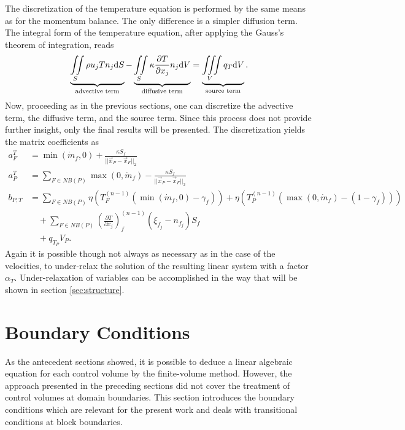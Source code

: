 The discretization of the temperature equation is performed by the same means as for the momentum balance. The only difference is a simpler diffusion term. The integral form of the temperature equation, after applying the Gauss's theorem of integration, reads
\begin{displaymath}
  \underbrace{ \iint\limits_S \rho u_j T n_j \mathrm{d}S }_{\text{advective term}}
  - \underbrace{ \iint\limits_S \kappa \frac{\partial T}{\partial x_j} n_j \mathrm{d}V }_{\text{diffusive term}}
  = \underbrace{\iiint\limits_V \vphantom{\frac{ T}{ x_j} } q_T \mathrm{d}V }_{\text{source term}}.
\end{displaymath}
Now, proceeding as in the previous sections, one can discretize the advective term, the diffusive term, and the source term. Since this process does not provide further insight, only the final results will be presented. The discretization yields the matrix coefficients as
  \begin{align*}
    a_F^{T} &= \min(\dot{m}_f,0) + \frac{\kappa S_f}{||\vec{x}_P - \vec{x}_F||_2} \\[1em]
    a_P^{T} &= \sum_{F \in NB(P)}\max(0,\dot{m}_f) - \frac{\kappa S_f}{||\vec{x}_P - \vec{x}_F||_2} \\[1em]
    b_{P,T} &= \sum_{F \in NB(P)} \eta  \left(T_F^{(n-1)} \left( \min(\dot{m}_f,0) - \gamma_f \right)\right) 
             + \eta \left( T_{P}^{(n-1)} \left( \max(0,\dot{m}_f) - \left(1 - \gamma_f\right) \right)\right) \nonumber \\[0.5em]
            &\quad + \sum_{F \in NB(P)} \left( \frac{\partial T}{\partial x_j}\right)_f^{(n-1)} \left(\xi_{f_j} - n_{f_j}\right)S_f \nonumber \\[0.5em]
            &\quad + q_{T_P} V_P.
  \end{align*}
Again it is possible though not always as necessary as in the case of the velocities, to under-relax the solution of the resulting linear system with a factor \(\alpha_T\). Under-relaxation of variables can be accomplished in the way that will be shown in section \ref{sec:structure}.

\section{Boundary Conditions}
\label{sec:segboundary}

As the antecedent sections showed, it is possible to deduce a linear algebraic equation for each control volume by the finite-volume method. However, the approach presented in the preceding sections did not cover the treatment of control volumes at domain boundaries. This section introduces the boundary conditions which are relevant for the present work and deals with transitional conditions at block boundaries.

